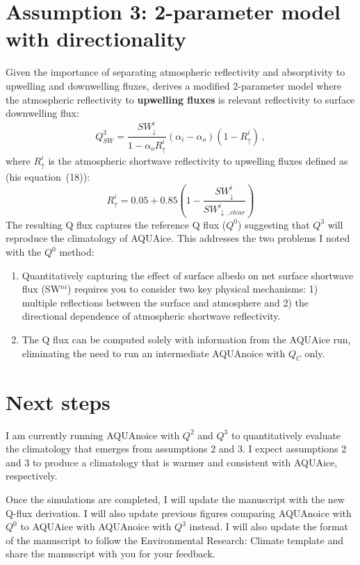 \documentclass{article}
\begin{document}
\section{Assumption 3: 2-parameter model with directionality}
Given the importance of separating atmospheric reflectivity and absorptivity to upwelling and downwelling fluxes, \cite{winton2005} derives a modified 2-parameter model where the atmospheric reflectivity to \textbf{upwelling fluxes} is relevant reflectivity to surface downwelling flux:
\begin{equation} \label{eq:qs3}
    Q^3_{SW}=\frac{SW^{i}_{\downarrow}}{1-\alpha_oR^i_\uparrow}(\alpha_i-\alpha_o)(1-R^i_\uparrow)\,,
\end{equation}
where $R^i_\uparrow$ is the atmospheric shortwave reflectivity to upwelling fluxes defined as (his equation~(18)):
\begin{equation}
    R^i_\uparrow=0.05+0.85\left(1-\frac{SW^i_\downarrow}{SW^i_{\downarrow\,,clear}}\right)
\end{equation}
The resulting Q flux captures the reference Q flux ($Q^0$) suggesting that $Q^3$ will reproduce the climatology of AQUAice. This addresses the two problems I noted with the $Q^0$ method:
\begin{enumerate}
    \item Quantitatively capturing the effect of surface albedo on net surface shortwave flux (SW$^{ni}$) requires you to consider two key physical mechanisms: 1) multiple reflections between the surface and atmosphere and 2) the directional dependence of atmospheric shortwave reflectivity.
    \item The Q flux can be computed solely with information from the AQUAice run, eliminating the need to run an intermediate AQUAnoice with $Q_C$ only.
\end{enumerate}

\section{Next steps}
I am currently running AQUAnoice with $Q^2$ and $Q^3$ to quantitatively evaluate the climatology that emerges from assumptions 2 and 3. I expect assumptions 2 and 3 to produce a climatology that is warmer and consistent with AQUAice, respectively.

Once the simulations are completed, I will update the manuscript with the new Q-flux derivation. I will also update previous figures comparing AQUAnoice with $Q^0$ to AQUAice with AQUAnoice with $Q^3$ instead. I will also update the format of the manuscript to follow the Environmental Research: Climate template and share the manuscript with you for your feedback.




\end{document}
